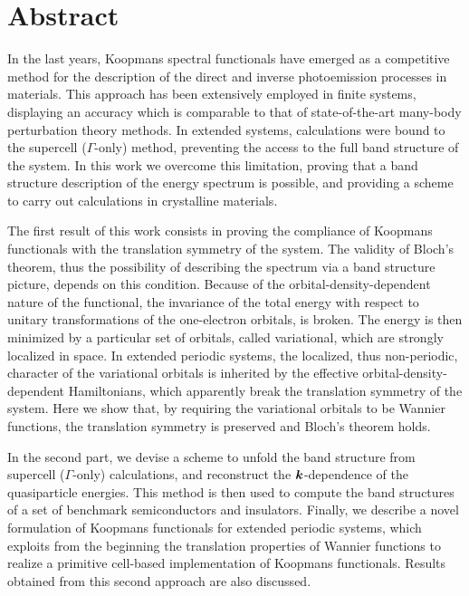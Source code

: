 \begingroup
\let\cleardoublepage\clearpage

\cleardoublepage
\chapter*{Abstract}
\vspace{2cm}
%

In the last years, Koopmans spectral functionals have emerged as a competitive method for the description of the direct and inverse photoemission processes in materials. This approach has been extensively employed in finite systems, displaying an accuracy which is comparable to that of state-of-the-art many-body perturbation theory methods. In extended systems, calculations were bound to the supercell ($\Gamma$-only) method, preventing the access to the full band structure of the system. In this work we overcome this limitation, proving that a band structure description of the energy spectrum is possible, and providing a scheme to carry out calculations in crystalline materials.

The first result of this work consists in proving the compliance of Koopmans functionals with the translation symmetry of the system. The validity of Bloch's theorem, thus the possibility of describing the spectrum via a band structure picture, depends on this condition. Because of the orbital-density-dependent nature of the functional, the invariance of the total energy with respect to unitary transformations of the one-electron orbitals, is broken. The energy is then minimized by a particular set of orbitals, called variational, which are strongly localized in space. In extended periodic systems, the localized, thus non-periodic, character of the variational orbitals is inherited by the effective orbital-density-dependent Hamiltonians, which apparently break the translation symmetry of the system. Here we show that, by requiring the variational orbitals to be Wannier functions, the translation symmetry is preserved and Bloch's theorem holds.

In the second part, we devise a scheme to unfold the band structure from supercell ($\Gamma$-only) calculations, and reconstruct the ${\bm k}$-dependence of the quasiparticle energies. This method is then used to compute the band structures of a set of benchmark semiconductors and insulators. Finally, we describe a novel formulation of Koopmans functionals for extended periodic systems, which exploits from the beginning the translation properties of Wannier functions to realize a primitive cell-based implementation of Koopmans functionals. Results obtained from this second approach are also discussed.

